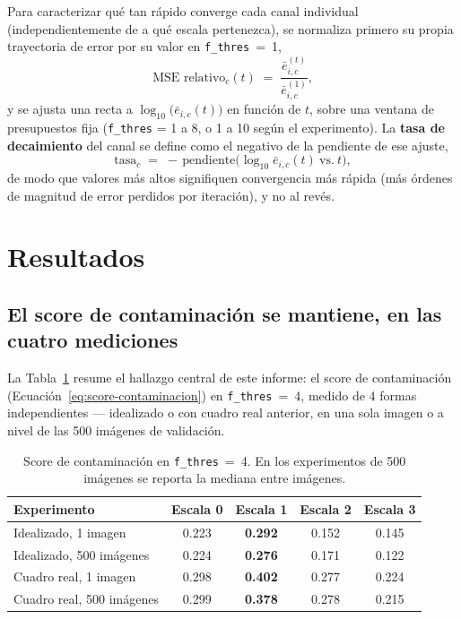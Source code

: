 \documentclass[11pt,a4paper]{article}
\newcommand{\code}[1]{\texttt{#1}}
\begin{document}
Para caracterizar qué tan rápido converge cada canal individual (independientemente de a qué
escala pertenezca), se normaliza primero su propia trayectoria de error por su valor en
\code{f\_thres}~=~1,
\begin{equation}
  \text{MSE relativo}_{c}(t) \;=\; \frac{\bar e_{i,c}^{(t)}}{\bar e_{i,c}^{(1)}},
\end{equation}
y se ajusta una recta a $\log_{10}\big(\bar e_{i,c}(t)\big)$ en función de $t$, sobre una ventana de
presupuestos fija (\code{f\_thres} = 1 a 8, o 1 a 10 según el experimento). La \textbf{tasa de
decaimiento} del canal se define como el negativo de la pendiente de ese ajuste,
\begin{equation}
  \text{tasa}_c \;=\; -\,\text{pendiente}\Big(\log_{10}\bar e_{i,c}(t) \ \text{vs.}\ t\Big),
  \label{eq:tasa-decaimiento}
\end{equation}
de modo que valores más altos signifiquen convergencia más rápida (más órdenes de magnitud de error
perdidos por iteración), y no al revés.


\section{Resultados}
\label{sec:resultados}

\subsection{El score de contaminación se mantiene, en las cuatro mediciones}

La Tabla~\ref{tab:resultado-central} resume el hallazgo central de este informe: el score de
contaminación (Ecuación~\eqref{eq:score-contaminacion}) en \code{f\_thres}~=~4, medido de 4 formas
independientes --- idealizado o con cuadro real anterior, en una sola imagen o a nivel de las 500
imágenes de validación.

\begin{table}[H]
  \centering
  \caption{Score de contaminación en \code{f\_thres}~=~4. En los experimentos de 500 imágenes se
    reporta la mediana entre imágenes.}
  \label{tab:resultado-central}
  \begin{tabular}{@{}lcccc@{}}
    \toprule
    Experimento & Escala 0 & Escala 1 & Escala 2 & Escala 3 \\
    \midrule
    Idealizado, 1 imagen         & 0.223 & \textbf{0.292} & 0.152 & 0.145 \\
    Idealizado, 500 imágenes     & 0.224 & \textbf{0.276} & 0.171 & 0.122 \\
    Cuadro real, 1 imagen        & 0.298 & \textbf{0.402} & 0.277 & 0.224 \\
    Cuadro real, 500 imágenes    & 0.299 & \textbf{0.378} & 0.278 & 0.215 \\
    \bottomrule
  \end{tabular}
\end{table}
\end{document}
